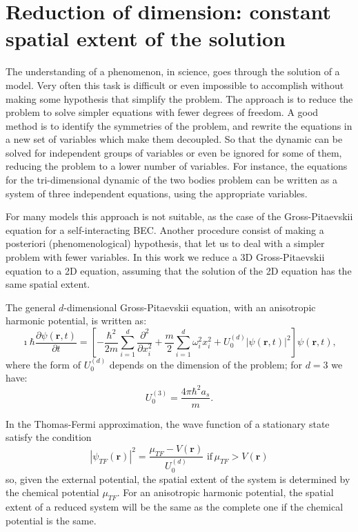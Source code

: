 \chapter{Reduction of dimension: constant spatial extent of the solution} \label{App:A}
The understanding of a phenomenon, in science, goes through the solution of a model. Very often this task is difficult or even impossible to accomplish without making some hypothesis that simplify the problem. The approach is to reduce the problem to solve simpler equations with fewer degrees of freedom. A good method is to identify the symmetries of the problem, and rewrite the equations in a new set of variables which make them decoupled. So that the dynamic can be solved for independent groups of variables or even be ignored for some of them, reducing the problem to a lower number of variables. For instance, the equations for the tri-dimensional dynamic of the two bodies problem can be written as a system of three independent equations, using the appropriate variables.

For many models this approach is not suitable, as the case of the Gross-Pitaevskii equation for a self-interacting BEC. Another procedure consist of making a posteriori (phenomenological) hypothesis, that let us to deal with a simpler problem with fewer variables. In this work we reduce a 3D Gross-Pitaevskii equation to a 2D equation, assuming that the solution of the 2D equation has the same spatial extent.

The general $d$-dimensional Gross-Pitaevskii equation, with an anisotropic harmonic potential, is written as:
\begin{equation}
\imath \hbar \frac{\partial \psi(\textbf{r}, t)}{\partial t} = \left[ - \frac{\hbar^2}{2m} \sum_{i=1}^d \frac{\partial^2}{\partial x_i^2} + \frac{m}{2} \sum_{i=1}^d \omega_i^2 x_i^2 + U_0^{(d)} |\psi(\textbf{r}, t)|^2 \right] \psi(\textbf{r}, t),
\end{equation}
where the form of $U_0^{(d)}$ depends on the dimension of the problem; for $d=3$ we have:
\begin{equation}
U_0^{(3)} = \frac{4\pi \hbar^2 a_s}{m}.
\end{equation}

In the Thomas-Fermi approximation, the wave function of a stationary state satisfy the condition
\begin{equation}
|\psi_{TF}(\textbf{r})|^2 = \frac{\mu_{TF} - V(\textbf{r})}{U_0^{(d)}} \,\, \mathrm{if} \, \mu_{TF}  > V(\textbf{r})
\end{equation}
so, given the external potential, the spatial extent of the system is determined by the chemical potential $\mu_{TF}$. For an anisotropic harmonic potential, the spatial extent of a reduced system will be the same as the complete one if the chemical potential is the same.

